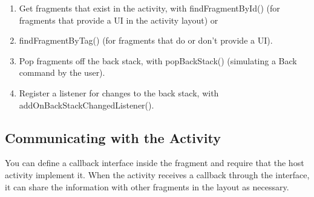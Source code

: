 \begin{enumerate}
	\item Get fragments that exist in the activity, with findFragmentById() (for fragments that provide a UI in the activity layout) or \item findFragmentByTag() (for fragments that do or don't provide a UI).
	\item Pop fragments off the back stack, with popBackStack() (simulating a Back command by the user).
	\item Register a listener for changes to the back stack, with addOnBackStackChangedListener().
\end{enumerate}

\subsection{Communicating with the Activity}
You can  define a callback interface inside the fragment and require that the host activity implement it. When the activity receives a callback through the interface, it can share the information with other fragments in the layout as necessary.





